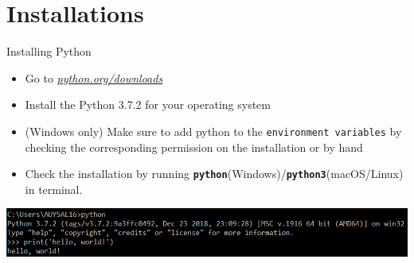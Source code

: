 	\section{Installations}

	 	\begin{frame}{Installing Python}
			\LARGE
			\begin{itemize}
				\item Go to \href{https://www.python.org/downloads/}{\underline{\textit{python.org/downloads}}}
				\item Install the Python 3.7.2 for your operating system
				\item (Windows only) Make sure to add python to the \texttt{environment variables} by checking the corresponding permission on the installation or by hand
				\item Check the installation by running \textbf{\texttt{python}}(Windows)/\textbf{\texttt{python3}}(macOS/Linux) in terminal.
			\end{itemize}
			\includegraphics[width=\textwidth]{images/cmd_helloworld.PNG}
		\end{frame}
		 
